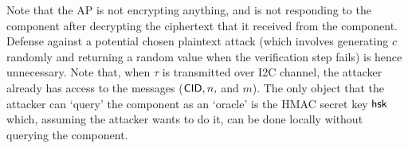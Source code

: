 


\iflong
\begin{rem}
Note that the AP is not encrypting anything, and is not responding to the component after decrypting the ciphertext that it received from the component. Defense against a potential chosen plaintext attack (which involves generating $c$ randomly and returning a random value when the verification step fails) is hence unnecessary. Note that, when $\tau$ is transmitted over I2C channel, the attacker already has access to the messages ($\mathsf{CID}, n, $ and $m$). The only object that the attacker can `query' the component as an `oracle' is the HMAC secret key $\mathsf{hsk}$ which, assuming the attacker wants to do it, can be done locally without querying the component. 
\end{rem}
\fi
{} 


